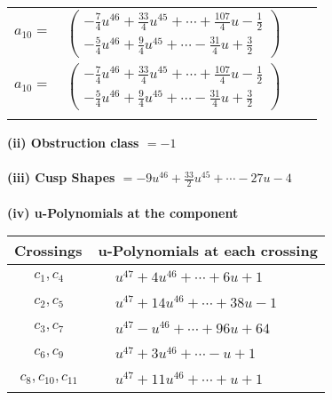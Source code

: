 \documentclass[1p]{elsarticle_modified}
\theoremstyle{definition}
\begin{document}
\begin{tabular}{m{7pt} m{180pt} m{7pt} m{180pt} }
\flushright $a_{10}=$&$\begin{pmatrix}-\frac{7}{4} u^{46}+\frac{33}{4} u^{45}+\cdots+\frac{107}{4} u-\frac{1}{2}\\-\frac{5}{4} u^{46}+\frac{9}{4} u^{45}+\cdots-\frac{31}{4} u+\frac{3}{2}\end{pmatrix}$\\ \flushright $a_{10}=$&$\begin{pmatrix}-\frac{7}{4} u^{46}+\frac{33}{4} u^{45}+\cdots+\frac{107}{4} u-\frac{1}{2}\\-\frac{5}{4} u^{46}+\frac{9}{4} u^{45}+\cdots-\frac{31}{4} u+\frac{3}{2}\end{pmatrix}$\\&\end{tabular}
\flushleft \textbf{(ii) Obstruction class $= -1$}\\~\\
\flushleft \textbf{(iii) Cusp Shapes $= -9 u^{46}+\frac{33}{2} u^{45}+\cdots-27 u-4$}\\~\\
\newpage\renewcommand{\arraystretch}{1}
\flushleft \textbf{(iv) u-Polynomials at the component}\newline \\
\begin{tabular}{m{50pt}|m{274pt}}
Crossings & \hspace{64pt}u-Polynomials at each crossing \\
\hline $$\begin{aligned}c_{1},c_{4}\end{aligned}$$&$\begin{aligned}
&u^{47}+4 u^{46}+\cdots+6 u+1
\end{aligned}$\\
\hline $$\begin{aligned}c_{2},c_{5}\end{aligned}$$&$\begin{aligned}
&u^{47}+14 u^{46}+\cdots+38 u-1
\end{aligned}$\\
\hline $$\begin{aligned}c_{3},c_{7}\end{aligned}$$&$\begin{aligned}
&u^{47}- u^{46}+\cdots+96 u+64
\end{aligned}$\\
\hline $$\begin{aligned}c_{6},c_{9}\end{aligned}$$&$\begin{aligned}
&u^{47}+3 u^{46}+\cdots- u+1
\end{aligned}$\\
\hline $$\begin{aligned}c_{8},c_{10},c_{11}\end{aligned}$$&$\begin{aligned}
&u^{47}+11 u^{46}+\cdots+u+1
\end{aligned}$\\
\hline
\end{tabular}\\~\\
\end{document}
